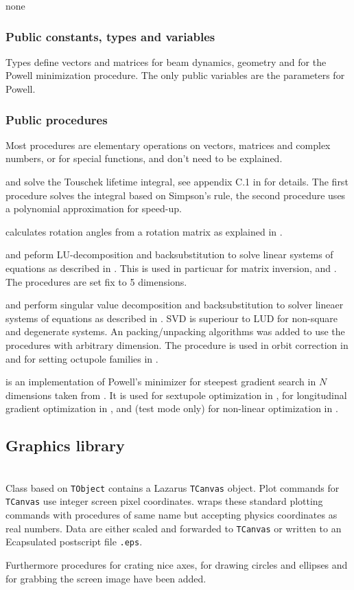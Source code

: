 \documentclass[12pt]{article}
\newcommand\code[1]{{\tt #1}}
\newcommand{\unico}[1]{{\color{burntorange}\code{#1}}}
\newcommand{\opagui}[1]{\colorbox{blue!20}{{\color{black}\code{#1}}}}
\newcommand{\ogui}[1]{\hyperref[#1]{\opagui{#1}}}
\newcommand{\opauni}[1]{\colorbox{orange!30}{{\color{black}\code{#1}}}}
\newcommand{\ounih}[2]{\subsection{\label{#2}#1}{\Huge\opauni{#2}}\\}
\newcommand{\ouni}[1]{\hyperref[#1]{\opauni{#1}}}
\newcommand{\uses}[1]{\flushleft {\bf Uses:} #1}
\newcommand{\desc}[1]{#1}
\newcommand{\pvar}[1]{\subsubsection*{Public constants, types and variables} #1}
\newcommand{\ppro}[1]{\subsubsection*{Public procedures} #1}
\begin{document}
\uses{none}

\pvar{
Types define vectors and matrices for beam dynamics, geometry and for the Powell minimization procedure. The only public variables are the parameters for Powell. 
}

\ppro{
Most procedures are elementary operations on vectors, matrices and complex numbers, or for special functions, and don't need to be explained.

\unico{CTouschek} and \unico{CTouschek\_pol} solve the Touschek lifetime integral, see appendix C.1 in \cite{inside} for details. The first procedure solves the integral based on Simpson's rule, the second procedure uses a polynomial approximation for speed-up. 

\unico{EulerAng} calculates rotation angles from a rotation matrix as explained in \cite{euler}.

\unico{LUDCMP} and \unico{LUBKSB} peform LU-decomposition and backsubstitution to solve linear systems of equations as described in \cite{numrec}. This is used in particuar for matrix inversion, \unico{MatInv} and \unico{MatDet}. The procedures are set fix to 5 dimensions.


\unico{svdcmp} and \unico{svbksb} perform singular value decomposition and backsubstitution to solver lineaer systems of equations as described in \cite{numrec}. SVD is superiour to LUD for non-square and degenerate systems. An packing/unpacking algorithms was added to use the procedures with arbitrary dimension. The procedure is used in orbit correction in \ogui{opaorbit} and for setting octupole families in \ogui{opachroma}.

\unico{Powell} is an implementation of Powell's minimizer for steepest gradient search in $N$ dimensions taken from \cite{numrec}. It is used for sextupole optimization in \ogui{opachroma}, for longitudinal gradient optimization in \ogui{opalgbedit}, and (test mode only) for non-linear optimization in \ogui{opamomentum}.
}

\ounih{Graphics library}{../com/vgraph}

\desc{
Class \unico{Vplot} based on \code{TObject} contains a Lazarus \code{TCanvas} object. Plot commands for \code{TCanvas}  use integer screen pixel coordinates. \ouni{../com/vgraph} wraps these standard plotting commands with procedures of same name but accepting physics coordinates as real numbers. Data are either scaled and forwarded to \code{TCanvas}  or written to an Ecapsulated postscript file \code{*.eps}.

Furthermore procedures for crating nice axes, for drawing circles and ellipses and for grabbing the screen image have been added.
}
\end{document}
